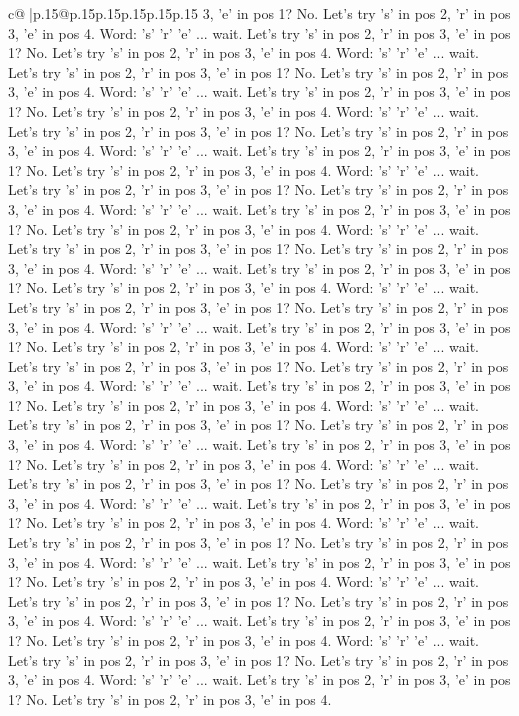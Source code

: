 \documentclass{article}
\begin{document}
{\begin{supertabular}{c@{$\;$}|p{.15\linewidth}@{}p{.15\linewidth}p{.15\linewidth}p{.15\linewidth}p{.15\linewidth}p{.15\linewidth}}
{{{3, 'e' in pos 1? No. Let's try 's' in pos 2, 'r' in pos 3, 'e' in pos 4. Word: 's' 'r' 'e' ... wait. Let's try 's' in pos 2, 'r' in pos 3, 'e' in pos 1? No. Let's try 's' in pos 2, 'r' in pos 3, 'e' in pos 4. Word: 's' 'r' 'e' ... wait. Let's try 's' in pos 2, 'r' in pos 3, 'e' in pos 1? No. Let's try 's' in pos 2, 'r' in pos 3, 'e' in pos 4. Word: 's' 'r' 'e' ... wait. Let's try 's' in pos 2, 'r' in pos 3, 'e' in pos 1? No. Let's try 's' in pos 2, 'r' in pos 3, 'e' in pos 4. Word: 's' 'r' 'e' ... wait. Let's try 's' in pos 2, 'r' in pos 3, 'e' in pos 1? No. Let's try 's' in pos 2, 'r' in pos 3, 'e' in pos 4. Word: 's' 'r' 'e' ... wait. Let's try 's' in pos 2, 'r' in pos 3, 'e' in pos 1? No. Let's try 's' in pos 2, 'r' in pos 3, 'e' in pos 4. Word: 's' 'r' 'e' ... wait. Let's try 's' in pos 2, 'r' in pos 3, 'e' in pos 1? No. Let's try 's' in pos 2, 'r' in pos 3, 'e' in pos 4. Word: 's' 'r' 'e' ... wait. Let's try 's' in pos 2, 'r' in pos 3, 'e' in pos 1? No. Let's try 's' in pos 2, 'r' in pos 3, 'e' in pos 4. Word: 's' 'r' 'e' ... wait. Let's try 's' in pos 2, 'r' in pos 3, 'e' in pos 1? No. Let's try 's' in pos 2, 'r' in pos 3, 'e' in pos 4. Word: 's' 'r' 'e' ... wait. Let's try 's' in pos 2, 'r' in pos 3, 'e' in pos 1? No. Let's try 's' in pos 2, 'r' in pos 3, 'e' in pos 4. Word: 's' 'r' 'e' ... wait. Let's try 's' in pos 2, 'r' in pos 3, 'e' in pos 1? No. Let's try 's' in pos 2, 'r' in pos 3, 'e' in pos 4. Word: 's' 'r' 'e' ... wait. Let's try 's' in pos 2, 'r' in pos 3, 'e' in pos 1? No. Let's try 's' in pos 2, 'r' in pos 3, 'e' in pos 4. Word: 's' 'r' 'e' ... wait. Let's try 's' in pos 2, 'r' in pos 3, 'e' in pos 1? No. Let's try 's' in pos 2, 'r' in pos 3, 'e' in pos 4. Word: 's' 'r' 'e' ... wait. Let's try 's' in pos 2, 'r' in pos 3, 'e' in pos 1? No. Let's try 's' in pos 2, 'r' in pos 3, 'e' in pos 4. Word: 's' 'r' 'e' ... wait. Let's try 's' in pos 2, 'r' in pos 3, 'e' in pos 1? No. Let's try 's' in pos 2, 'r' in pos 3, 'e' in pos 4. Word: 's' 'r' 'e' ... wait. Let's try 's' in pos 2, 'r' in pos 3, 'e' in pos 1? No. Let's try 's' in pos 2, 'r' in pos 3, 'e' in pos 4. Word: 's' 'r' 'e' ... wait. Let's try 's' in pos 2, 'r' in pos 3, 'e' in pos 1? No. Let's try 's' in pos 2, 'r' in pos 3, 'e' in pos 4. Word: 's' 'r' 'e' ... wait. Let's try 's' in pos 2, 'r' in pos 3, 'e' in pos 1? No. Let's try 's' in pos 2, 'r' in pos 3, 'e' in pos 4. Word: 's' 'r' 'e' ... wait. Let's try 's' in pos 2, 'r' in pos 3, 'e' in pos 1? No. Let's try 's' in pos 2, 'r' in pos 3, 'e' in pos 4. Word: 's' 'r' 'e' ... wait. Let's try 's' in pos 2, 'r' in pos 3, 'e' in pos 1? No. Let's try 's' in pos 2, 'r' in pos 3, 'e' in pos 4. Word: 's' 'r' 'e' ... wait. Let's try 's' in pos 2, 'r' in pos 3, 'e' in pos 1? No. Let's try 's' in pos 2, 'r' in pos 3, 'e' in pos 4. Word: 's' 'r' 'e' ... wait. Let's try 's' in pos 2, 'r' in pos 3, 'e' in pos 1? No. Let's try 's' in pos 2, 'r' in pos 3, 'e' in pos 4. Word: 's' 'r' 'e' ... wait. Let's try 's' in pos 2, 'r' in pos 3, 'e' in pos 1? No. Let's try 's' in pos 2, 'r' in pos 3, 'e' in pos 4. Word: 's' 'r' 'e' ... wait. Let's try 's' in pos 2, 'r' in pos 3, 'e' in pos 1? No. Let's try 's' in pos 2, 'r' in pos 3, 'e' in pos 4. }}}
\end{supertabular}}
\end{document}
